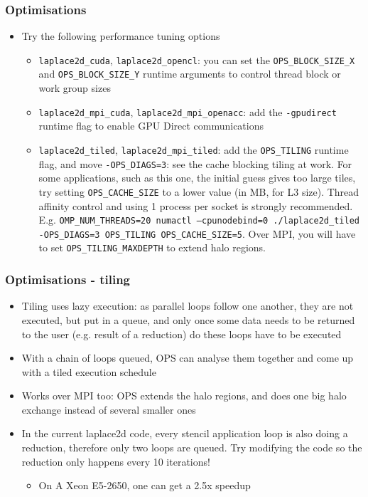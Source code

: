 \documentclass{beamer}
\begin{document}
\begin{frame}[fragile]
\frametitle{Optimisations}
\begin{itemize}
\item Try the following performance tuning options
\begin{itemize}
  \item \texttt{laplace2d\_cuda}, \texttt{laplace2d\_opencl}: you can set the \texttt{OPS\_BLOCK\_SIZE\_X} and \texttt{OPS\_BLOCK\_SIZE\_Y} runtime arguments to control thread block or work group sizes
  \item \texttt{laplace2d\_mpi\_cuda}, \texttt{laplace2d\_mpi\_openacc}: add the \texttt{-gpudirect} runtime flag to enable GPU Direct communications
  \item \texttt{laplace2d\_tiled}, \texttt{laplace2d\_mpi\_tiled}: add the \texttt{OPS\_TILING} runtime flag, and move \texttt{-OPS\_DIAGS=3}: see the cache blocking tiling at work. For some applications, such as this one, the initial guess gives too large tiles, try setting \texttt{OPS\_CACHE\_SIZE} to a lower value (in MB, for L3 size). Thread affinity control and using 1 process per socket is strongly recommended. E.g. \texttt{OMP\_NUM\_THREADS=20 numactl --cpunodebind=0 ./laplace2d\_tiled -OPS\_DIAGS=3 OPS\_TILING OPS\_CACHE\_SIZE=5}. Over MPI, you will have to set \texttt{OPS\_TILING\_MAXDEPTH} to extend halo regions.
\end{itemize}
\end{itemize}
\end{frame}

\begin{frame}[fragile]
\frametitle{Optimisations - tiling}
\begin{itemize}
\item Tiling uses lazy execution: as parallel loops follow one another, they are not executed, but put in a queue, and only once some data needs to be returned to the user (e.g. result of a reduction) do these loops have to be executed
\item With a chain of loops queued, OPS can analyse them together and come up with a tiled execution schedule
\item Works over MPI too: OPS extends the halo regions, and does one big halo exchange instead of several smaller ones
\item In the current laplace2d code, every stencil application loop is also doing a reduction, therefore only two loops are queued. Try modifying the code so the reduction only happens every 10 iterations!
\begin{itemize}
\item On A Xeon E5-2650, one can get a 2.5x speedup
\end{itemize}
\end{itemize}
\end{frame}
\end{document}
